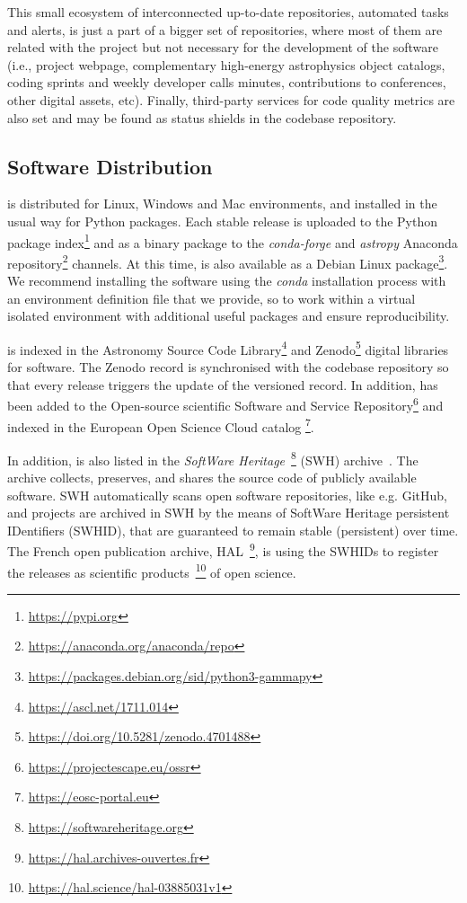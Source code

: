 \documentclass[longauth]{aa}
\begin{document}
This small ecosystem of interconnected up-to-date repositories, automated tasks
and alerts, is just a part of a bigger set of \github repositories, where most
of them are related with the project but not necessary for the development of
the software (i.e., project webpage, complementary high-energy astrophysics
object catalogs, coding sprints and weekly developer calls minutes,
contributions to conferences, other digital assets, etc). Finally, third-party
services for code quality metrics are also set and may be found as status
shields in the codebase repository.

\subsection{Software Distribution}
\label{ssec:software-distribution}
\gammapy is distributed for Linux, Windows and Mac environments, and installed
in the usual way for Python packages. Each stable release is uploaded to the
Python package index\footnote{\url{https://pypi.org}} and as a binary package
to the \textit{conda-forge} and \textit{astropy} Anaconda
repository\footnote{\url{https://anaconda.org/anaconda/repo}} channels. At this
time, \gammapy is also available as a Debian Linux
package\footnote{\url{https://packages.debian.org/sid/python3-gammapy}}. We
recommend installing the software using the \textit{conda} installation process
with an environment definition file that we provide, so to work within a
virtual isolated environment with additional useful packages and ensure
reproducibility.

\gammapy is indexed in the Astronomy Source Code
Library\footnote{\url{https://ascl.net/1711.014}} and
Zenodo\footnote{\url{https://doi.org/10.5281/zenodo.4701488}} digital libraries for
software. The Zenodo record is synchronised with the codebase \github repository
so that every release triggers the update of the versioned record. In addition,
 \gammapy has been added to the Open-source scientific
Software and Service Repository\footnote{\url{https://projectescape.eu/ossr}} \citep{10.12688/openreseurope.15692.1}
and indexed in the European Open Science Cloud
catalog \footnote{\url{https://eosc-portal.eu}}.

In addition, \gammapy is also listed in the \textit{SoftWare
Heritage}~\footnote{\url{https://softwareheritage.org}} (SWH) archive~\cite{DiCosmo2020}.
The archive collects, preserves, and shares the source code of publicly available software.
SWH automatically scans open software repositories, like e.g. GitHub, and projects are archived in SWH by the
means of SoftWare Heritage persistent IDentifiers (SWHID), that are guaranteed to remain stable (persistent)
over time. The French open publication archive, HAL~\footnote{\url{https://hal.archives-ouvertes.fr}},
is using the \gammapy SWHIDs to register the releases as scientific
products~\footnote{\url{https://hal.science/hal-03885031v1}} of open science.
\end{document}
